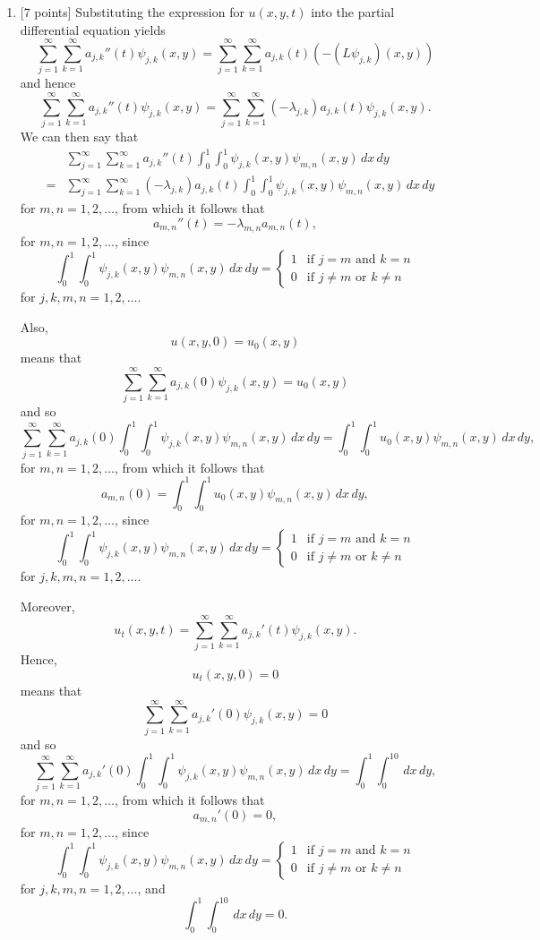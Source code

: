 \begin{solution}
\begin{enumerate}
\item {[7 points]} Substituting the expression for $u(x,y,t)$ into the partial differential equation yields
\[
\sum_{j=1}^\infty \sum_{k=1}^\infty a_{j,k}''(t) \psi_{j,k}(x,y) = \sum_{j=1}^\infty \sum_{k=1}^\infty a_{j,k}(t) \left(-\left(L\psi_{j,k}\right)(x,y)\right)
\]
and hence
\[
\sum_{j=1}^\infty \sum_{k=1}^\infty a_{j,k}'' (t) \psi_{j,k}(x,y) = \sum_{j=1}^\infty \sum_{k=1}^\infty \left(-\lambda_{j,k}\right)a_{j,k}(t)\psi_{j,k}(x,y).
\]
We can then say that
\begin{eqnarray*}
&&\sum_{j=1}^\infty \sum_{k=1}^\infty a_{j,k}'' (t) \int_0^1\int_0^1\psi_{j,k}(x,y)\psi_{m,n} (x,y)\,dx\,dy
\\
&=&\sum_{j=1}^\infty \sum_{k=1}^\infty \left(-\lambda_{j,k}\right)a_{j,k}(t)\int_0^1\int_0^1\psi_{j,k}(x,y)\psi_{m,n} (x,y)\,dx\,dy
\end{eqnarray*}
for $m,n=1,2,\ldots$, from which it follows that
\[
a_{m,n}''(t)=-\lambda_{m,n} a_{m,n}(t),
\]
for $m,n=1,2,\ldots$, since
\[
\int_0^1\int_0^1\psi_{j,k} (x,y)\psi_{m,n} (x,y)\,dx\,dy = \left\{\begin{array}{ll} 1 & \mbox{if }j=m\mbox{ and }k=n \\ 0 & \mbox{if }j\ne m\mbox{ or }k\ne n \end{array}\right.
\]
for $j,k,m,n=1,2,\ldots$.

Also,
\[
u(x,y,0)=u_0(x,y)
\]
means that
\[
\sum_{j=1}^\infty \sum_{k=1}^\infty a_{j,k}(0) \psi_{j,k} (x,y)=u_0(x,y)
\]
and so
\[
\sum_{j=1}^\infty \sum_{k=1}^\infty a_{j,k}(0) \int_0^1\int_0^1\psi_{j,k} (x,y)\psi_{m,n} (x,y)\,dx\,dy=\int_0^1\int_0^1u_0(x,y)\psi_{m,n}(x,y)\,dx\,dy,
\]
for $m,n=1,2,\ldots$, from which it follows that
\[
a_{m,n}(0)=\int_0^1\int_0^1u_0(x,y)\psi_{m,n}(x,y)\,dx\,dy,
\]
for $m,n=1,2,\ldots$, since
\[
\int_0^1\int_0^1\psi_{j,k} (x,y)\psi_{m,n} (x,y)\,dx\,dy = \left\{\begin{array}{ll} 1 & \mbox{if }j=m\mbox{ and }k=n \\ 0 & \mbox{if }j\ne m\mbox{ or }k\ne n \end{array}\right.
\]
for $j,k,m,n=1,2,\ldots$.

Moreover,
\[
u_t(x,y,t)=\sum_{j=1}^\infty \sum_{k=1}^\infty a_{j,k}' (t) \psi_{j,k}(x,y).
\]
Hence,
\[
u_t(x,y,0)=0
\]
means that
\[
\sum_{j=1}^\infty \sum_{k=1}^\infty a_{j,k}'(0) \psi_{j,k} (x,y)=0
\]
and so
\[
\sum_{j=1}^\infty \sum_{k=1}^\infty a_{j,k}'(0) \int_0^1\int_0^1\psi_{j,k} (x,y)\psi_{m,n} (x,y)\,dx\,dy=\int_0^1\int_0^10\,dx\,dy,
\]
for $m,n=1,2,\ldots$, from which it follows that
\[
a_{m,n}'(0)=0,
\]
for $m,n=1,2,\ldots$, since
\[
\int_0^1\int_0^1\psi_{j,k} (x,y)\psi_{m,n} (x,y)\,dx\,dy = \left\{\begin{array}{ll} 1 & \mbox{if }j=m\mbox{ and }k=n \\ 0 & \mbox{if }j\ne m\mbox{ or }k\ne n \end{array}\right.
\]
for $j,k,m,n=1,2,\ldots$, and
\[
\int_0^1\int_0^10\,dx\,dy=0.
\]


\end{enumerate}
\end{solution}
